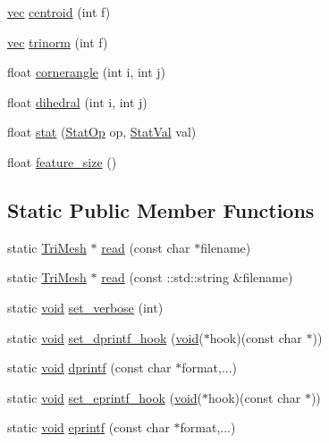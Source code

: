 \begin{DoxyCompactItemize}
\hyperlink{namespacetrimesh_a4fc2b83feba99c931f837a0c7d4b4df1}{vec} \hyperlink{classtrimesh_1_1TriMesh_a0668790be51229ba8cccb5c7d08bc80e}{centroid} (int f)
\item 
\hyperlink{namespacetrimesh_a4fc2b83feba99c931f837a0c7d4b4df1}{vec} \hyperlink{classtrimesh_1_1TriMesh_a05cd0934d0e6de50a259f543f28b9d3e}{trinorm} (int f)
\item 
float \hyperlink{classtrimesh_1_1TriMesh_a46d78ff16fb21643a67c2f58fd749758}{cornerangle} (int i, int j)
\item 
float \hyperlink{classtrimesh_1_1TriMesh_a6b15d408fb5d1d0f4781c565fd0d9554}{dihedral} (int i, int j)
\item 
float \hyperlink{classtrimesh_1_1TriMesh_a793bd16adf3bf29b6acbd66f52610e35}{stat} (\hyperlink{classtrimesh_1_1TriMesh_ad8f5106b2faaf0f6c168200b17c6229c}{Stat\+Op} op, \hyperlink{classtrimesh_1_1TriMesh_adc072d00dbda0d234d6eab9e77abbad1}{Stat\+Val} val)
\item 
float \hyperlink{classtrimesh_1_1TriMesh_a5e39bed326efb7c8a3ad122b9b371456}{feature\+\_\+size} ()
\end{DoxyCompactItemize}
\subsection*{Static Public Member Functions}
\begin{DoxyCompactItemize}
\item 
static \hyperlink{classtrimesh_1_1TriMesh}{Tri\+Mesh} $\ast$ \hyperlink{classtrimesh_1_1TriMesh_a9eaf940490dbbd34c965a1f06ba53036}{read} (const char $\ast$filename)
\item 
static \hyperlink{classtrimesh_1_1TriMesh}{Tri\+Mesh} $\ast$ \hyperlink{classtrimesh_1_1TriMesh_aaf39aa3a162bd08d98394ae2dfa98482}{read} (const \+::std\+::string \&filename)
\item 
static \hyperlink{namespacetrimesh_a784ddfd979e1c579bda795a8edfc3f43}{void} \hyperlink{classtrimesh_1_1TriMesh_a107b9f737b44d38b4bd5319ad23fccb3}{set\+\_\+verbose} (int)
\item 
static \hyperlink{namespacetrimesh_a784ddfd979e1c579bda795a8edfc3f43}{void} \hyperlink{classtrimesh_1_1TriMesh_a7f4ad4adea8a4e833f5492cea5199ee3}{set\+\_\+dprintf\+\_\+hook} (\hyperlink{namespacetrimesh_a784ddfd979e1c579bda795a8edfc3f43}{void}($\ast$hook)(const char $\ast$))
\item 
static \hyperlink{namespacetrimesh_a784ddfd979e1c579bda795a8edfc3f43}{void} \hyperlink{classtrimesh_1_1TriMesh_a772d07c46c272894e7feba9c1ba12e88}{dprintf} (const char $\ast$format,...)
\item 
static \hyperlink{namespacetrimesh_a784ddfd979e1c579bda795a8edfc3f43}{void} \hyperlink{classtrimesh_1_1TriMesh_aabda643552e4d21b9f64eca07f3dc194}{set\+\_\+eprintf\+\_\+hook} (\hyperlink{namespacetrimesh_a784ddfd979e1c579bda795a8edfc3f43}{void}($\ast$hook)(const char $\ast$))
\item 
static \hyperlink{namespacetrimesh_a784ddfd979e1c579bda795a8edfc3f43}{void} \hyperlink{classtrimesh_1_1TriMesh_a441d76c8ced667acd4e9f8ea15c1b304}{eprintf} (const char $\ast$format,...)
\end{DoxyCompactItemize}
